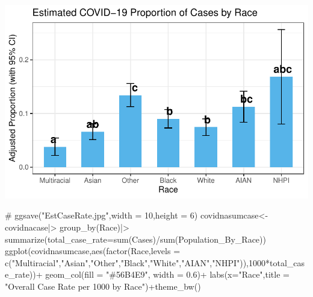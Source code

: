 \documentclass[
  letterpaper,
  DIV=11,
  numbers=noendperiod]{scrartcl}
\newenvironment{Shaded}{\begin{snugshade}}{\end{snugshade}}
\newcommand{\AttributeTok}[1]{\textcolor[rgb]{0.40,0.45,0.13}{#1}}
\newcommand{\CommentTok}[1]{\textcolor[rgb]{0.37,0.37,0.37}{#1}}
\newcommand{\DecValTok}[1]{\textcolor[rgb]{0.68,0.00,0.00}{#1}}
\newcommand{\FloatTok}[1]{\textcolor[rgb]{0.68,0.00,0.00}{#1}}
\newcommand{\FunctionTok}[1]{\textcolor[rgb]{0.28,0.35,0.67}{#1}}
\newcommand{\NormalTok}[1]{\textcolor[rgb]{0.00,0.23,0.31}{#1}}
\newcommand{\OtherTok}[1]{\textcolor[rgb]{0.00,0.23,0.31}{#1}}
\newcommand{\SpecialCharTok}[1]{\textcolor[rgb]{0.37,0.37,0.37}{#1}}
\newcommand{\StringTok}[1]{\textcolor[rgb]{0.13,0.47,0.30}{#1}}
\begin{document}
\includegraphics{StatsForFinalCSV_files/figure-pdf/unnamed-chunk-16-1.pdf}

\begin{Shaded}
\begin{Highlighting}[]
 \CommentTok{\# ggsave("EstCaseRate.jpg",width = 10,height = 6)}
\NormalTok{covidnasumcase}\OtherTok{\textless{}{-}}\NormalTok{covidnacase}\SpecialCharTok{|\textgreater{}}
  \FunctionTok{group\_by}\NormalTok{(Race)}\SpecialCharTok{|\textgreater{}}
  \FunctionTok{summarize}\NormalTok{(}\AttributeTok{total\_case\_rate=}\FunctionTok{sum}\NormalTok{(Cases)}\SpecialCharTok{/}\FunctionTok{sum}\NormalTok{(Population\_By\_Race))}
\FunctionTok{ggplot}\NormalTok{(covidnasumcase,}\FunctionTok{aes}\NormalTok{(}\FunctionTok{factor}\NormalTok{(Race,}\AttributeTok{levels =} \FunctionTok{c}\NormalTok{(}\StringTok{"Multiracial"}\NormalTok{,}\StringTok{"Asian"}\NormalTok{,}\StringTok{"Other"}\NormalTok{,}\StringTok{"Black"}\NormalTok{,}\StringTok{"White"}\NormalTok{,}\StringTok{"AIAN"}\NormalTok{,}\StringTok{"NHPI"}\NormalTok{)),}\DecValTok{1000}\SpecialCharTok{*}\NormalTok{total\_case\_rate))}\SpecialCharTok{+}
  \FunctionTok{geom\_col}\NormalTok{(}\AttributeTok{fill =} \StringTok{"\#56B4E9"}\NormalTok{, }\AttributeTok{width =} \FloatTok{0.6}\NormalTok{)}\SpecialCharTok{+}
  \FunctionTok{labs}\NormalTok{(}\AttributeTok{x=}\StringTok{"Race"}\NormalTok{,}\AttributeTok{title =} \StringTok{"Overall Case Rate per 1000 by Race"}\NormalTok{)}\SpecialCharTok{+}\FunctionTok{theme\_bw}\NormalTok{()}
\end{Highlighting}
\end{Shaded}
\end{document}
